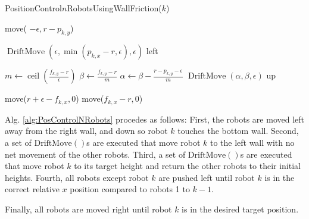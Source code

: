 \begin{algorithm}
\caption{PositionControl$n$RobotsUsingWallFriction($k$)}\label{alg:PosControlNRobots}
\begin{algorithmic}[1]
\State move( $-\epsilon, r-p_{k,y}$) %


\State $\operatorname{DriftMove}(\epsilon, \min(p_{k,x} - r,\epsilon), \epsilon)$ left   %
\EndWhile

\State $m \gets \operatorname{ceil}(\frac{f_{k,y}-r}{\epsilon})$
\State $\beta \gets \frac{f_{k,y}-r}{m}$
\State $\alpha \gets \beta - \frac{r - p_{k,y}-\epsilon}{m}$
\State $\operatorname{DriftMove}(\alpha, \beta, \epsilon)$ up   %
\EndFor

\State move($r+\epsilon-f_{k,x}, 0$)  %
\State move($f_{k,x}-r, 0$)  

\end{algorithmic}
\end{algorithm}

Alg. \ref{alg:PosControlNRobots} procedes as follows:  
First, the robots are moved left away from the right wall, and down so robot $k$ touches the bottom wall.
Second, a set of $\operatorname{DriftMove()}$s are executed that move robot $k$ to the left wall with no net movement of the other robots.
Third, a set of $\operatorname{DriftMove()}$s are executed that  move robot $k$ to its target height and return the other robots to their initial heights. 
Fourth, all robots except robot $k$ are pushed left until robot $k$ is in the correct relative $x$ position compared to robots 1 to $k-1$.

Finally, all robots are moved right until robot $k$ is in the desired target position.


